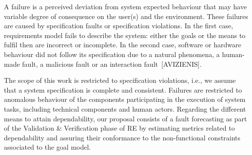 A failure is a perceived deviation from system expected behaviour that may have variable degree of consequence on the user(s) and the environment. These failures are caused by specification faults or specification violations. In the first case, requirements model fails to describe the system: either the goals or the means to fulfil then are incorrect or incomplete. In the second case, software or hardware behaviour did not follow its specification due to a natural phenomena, a human-made fault, a malicious fault or an interaction fault~[AVIZIENIS].


The scope of this work is restricted to specification violations, i.e., we assume that a system specification is complete and consistent. Failures are restricted to anomalous behaviour of the components participating in the execution of system tasks, including technical components and human actors. Regarding the different means to attain dependability, our proposal consists of a fault forecasting as part of the Validation \& Verification phase of RE by estimating metrics related to dependability and assuring their conformance to the non-functional constraints associated to the goal model. 


